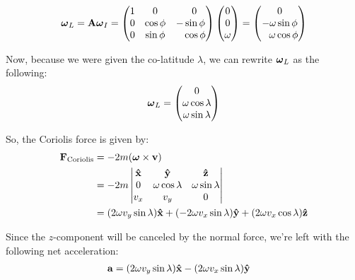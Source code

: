 \documentclass{article}
\begin{document}
\begin{equation*}
\vb*{\omega}_L = \textbf{A}\vb*{\omega}_I
= 
\begin{pmatrix*}[c]
1 & 0 & \phantom{-}0 \\
0 & \cos\phi & -\sin\phi \\
0 & \sin\phi & \phantom{-}\cos\phi
\end{pmatrix*}
\begin{pmatrix*}[c]
0 \\
0 \\
\omega \\
\end{pmatrix*}
=
\begin{pmatrix*}[c]
0 \\
-\omega\sin\phi \\
\phantom{-}\omega\cos\phi \\
\end{pmatrix*}
\end{equation*}

Now, because we were given the co-latitude $\lambda$, we can rewrite $\vb*{\omega}_L$ as the following:
\begin{equation*}
\vb*{\omega}_L =
\begin{pmatrix*}[c]
0 \\
\omega\cos\lambda \\
\omega\sin\lambda
\end{pmatrix*}
\end{equation*}

So, the Coriolis force is given by:
\begin{equation*}
\begin{aligned}
\vb{F}_{\text{Coriolis}} &= -2m(\vb*{\omega}\times \vb{v}) \\
&= -2m
\begin{vmatrix*}[c]
\vu{x} & \vu{y} & \vu{z} \\
0 & \omega\cos\lambda & \omega\sin\lambda \\
v_x & v_y & 0
\end{vmatrix*} \\
&=
(2\omega v_y \sin\lambda)\vu{x} + (-2\omega v_x \sin\lambda)\vu{y} + (2\omega v_x \cos\lambda)\vu{z}
\end{aligned}
\end{equation*}

Since the $z$-component will be canceled by the normal force, we're left with the following net acceleration:
\begin{equation*}
\begin{aligned}
\vb{a} &= (2\omega v_y \sin\lambda)\vu{x} - (2\omega v_x \sin\lambda)\vu{y}
\end{aligned}
\end{equation*}
\end{document}
